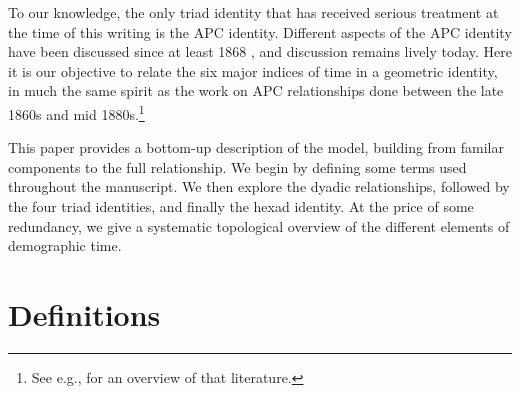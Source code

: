 \documentclass[11pt,oneside,a4paper]{article} %
\begin{document}
To our knowledge, the only triad identity that has received serious
treatment at the time of this writing is the APC identity. Different
aspects of the APC identity have been discussed since at least 1868
\citep{knapp1868ermittlung}, and discussion remains lively today. Here it is our
objective to relate the six major indices of time in a geometric identity, in
much the same spirit as the work on APC relationships done between the late
1860s and mid 1880s.\footnote{See e.g., \citet{keiding2011age} for an overview of that literature.} 

This paper provides a bottom-up description of the model, building from familar
components to the full relationship. We begin by defining some terms used
throughout the manuscript. We then explore the dyadic relationships, followed by
the four triad identities, and finally the hexad identity. At the price of some
redundancy, we give a systematic topological overview of the
different elements of demographic time. 

\section*{Definitions}
\end{document}

